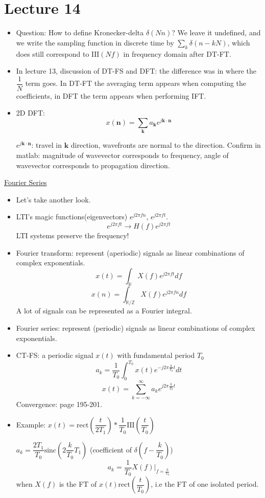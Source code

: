 \documentclass{article}
\begin{document}
\section{Lecture 14}
\begin{itemize}
    \item Question: How to define Kronecker-delta $\delta(Nn)$? We leave it undefined, and we write the sampling function in discrete time by $\sum_k\delta(n-kN)$, which does still correspond to $\mathrm{III}(Nf)$ in frequency domain after DT-FT.
    \item In lecture 13, discussion of DT-FS and DFT: the difference was in where the $\dfrac{1}{N}$ term goes. In DT-FT the averaging term appears when computing the coefficients, in DFT the term appears when performing IFT.
    \item 2D DFT: \[x(\mathrm{\mathbf{n}})=\sum_{\mathrm{\mathbf{k}}}a_\mathrm{\mathbf{k}}e^{j\mathrm{\mathbf{k\cdot n}}}\]
    
    $e^{j\mathrm{\mathbf{k\cdot n}}}$: travel in $\mathrm{\mathbf{k}}$ direction, wavefronts are normal to the direction. Confirm in matlab: magnitude of wavevector corresponds to frequency, angle of wavevector corresponds to propagation direction.
\end{itemize}
\underline{Fourier Series}
\begin{itemize}
    \item Let's take another look.
    \item LTI's magic functions(eigenvectors) $e^{j2\pi fn}$, $e^{j2\pi ft}$.
    \[e^{j2\pi ft}\longrightarrow H(f)e^{j2\pi ft}\]
    LTI systems preserve the frequency!
    \item Fourier transform: represent (aperiodic) signals as linear combinations of complex exponentials.
    \[x(t)=\int_{\mathbb{R}}X(f)e^{j2\pi ft}df\]
    \[x(n)=\int_{\mathbb{R}/\mathbb{Z}}X(f)e^{j2\pi fn}df\]
    A lot of signals can be represented as a Fourier integral.
    \item Fourier series: represent (periodic) signals as linear combinations of complex exponentials.
    \item CT-FS: a periodic signal $x(t)$ with fundamental period $T_0$
    \[a_k=\frac{1}{T_0}\int_{0}^{T_0}x(t)e^{-j2\pi \frac{k}{T_0}t}dt\]
    \[x(t)=\sum_{k=-\infty}^{\infty}{a_ke^{j2\pi \frac{k}{T_0}t}}\]
    Convergence: page 195-201.
    \item Example: $x(t)=\mathrm{rect}\left(\dfrac{t}{2T_1}\right)*\dfrac{1}{T_0}\mathrm{III}\left(\dfrac{t}{T_0}\right)$
    
    $a_k=\dfrac{2T_1}{T_0}\mathrm{sinc}\left(2\dfrac{k}{T_0}T_1\right)$ (coefficient of $\delta\left(f-\dfrac{k}{T_0}\right)$)
    \[a_k=\dfrac{1}{T_0}X(f)|_{f=\frac{k}{T_0}}\]
    when $X(f)$ is the FT of $x(t)\mathrm{rect}\left(\dfrac{t}{T_0}\right)$, i.e the FT of one isolated period.
\end{itemize}
\end{document}
